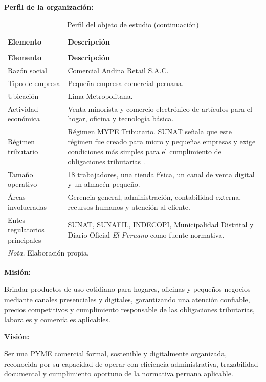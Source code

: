 \documentclass[12pt,a4paper,oneside]{report}
\begin{document}
\textbf{Perfil de la organización:}

\begin{longtable}{@{}p{}p{}@{}}
\caption{Perfil del objeto de estudio}\label{tab:perfil-objeto-estudio}\\
\toprule
\textbf{Elemento} & \textbf{Descripción} \\
\midrule
\endfirsthead
\caption[]{Perfil del objeto de estudio (continuación)}\\
\toprule
\textbf{Elemento} & \textbf{Descripción} \\
\midrule
\endhead
Razón social & Comercial Andina Retail S.A.C. \\
Tipo de empresa & Pequeña empresa comercial peruana. \\
Ubicación & Lima Metropolitana. \\
Actividad económica & Venta minorista y comercio electrónico de artículos para el hogar, oficina y tecnología básica. \\
Régimen tributario & Régimen MYPE Tributario. SUNAT señala que este régimen fue creado para micro y pequeñas empresas y exige condiciones más simples para el cumplimiento de obligaciones tributarias \parencite{sunatRMT2026}. \\
Tamaño operativo & 18 trabajadores, una tienda física, un canal de venta digital y un almacén pequeño. \\
Áreas involucradas & Gerencia general, administración, contabilidad externa, recursos humanos y atención al cliente. \\
Entes regulatorios principales & SUNAT, SUNAFIL, INDECOPI, Municipalidad Distrital y Diario Oficial \textit{El Peruano} como fuente normativa. \\
\bottomrule
\multicolumn{2}{p{0.94\textwidth}}{\normalsize \textit{Nota.} Elaboración propia.}\\
\end{longtable}

\textbf{Misión:}

Brindar productos de uso cotidiano para hogares, oficinas y pequeños negocios mediante canales presenciales y digitales, garantizando una atención confiable, precios competitivos y cumplimiento responsable de las obligaciones tributarias, laborales y comerciales aplicables.

\textbf{Visión:}

Ser una PYME comercial formal, sostenible y digitalmente organizada, reconocida por su capacidad de operar con eficiencia administrativa, trazabilidad documental y cumplimiento oportuno de la normativa peruana aplicable.
\end{document}
